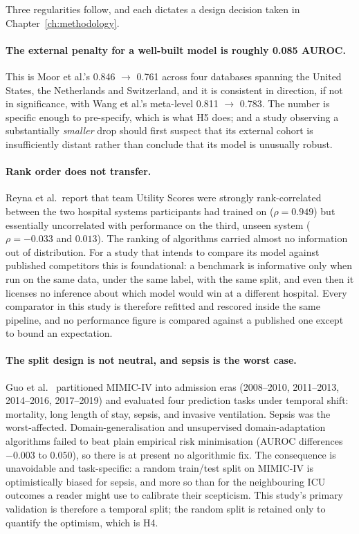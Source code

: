Three regularities follow, and each dictates a design decision taken in
Chapter~\ref{ch:methodology}.

\paragraph{The external penalty for a well-built model is roughly 0.085 AUROC.}
This is Moor et al.'s 0.846 $\rightarrow$ 0.761 across four databases spanning
the United States, the Netherlands and Switzerland, and it is consistent in
direction, if not in significance, with Wang et al.'s meta-level 0.811
$\rightarrow$ 0.783. The number is specific enough to pre-specify, which is
what H5 does; and a study observing a substantially \emph{smaller} drop should
first suspect that its external cohort is insufficiently distant rather than
conclude that its model is unusually robust.

\paragraph{Rank order does not transfer.} Reyna et al.\ report that team
Utility Scores were strongly rank-correlated between the two hospital systems
participants had trained on ($\rho = 0.949$) but essentially uncorrelated with
performance on the third, unseen system ($\rho = -0.033$ and $0.013$). The
ranking of algorithms carried almost no information out of distribution. For a
study that intends to compare its model against published competitors this is
foundational: a benchmark is informative only when run on the same data, under
the same label, with the same split, and even then it licenses no inference
about which model would win at a different hospital. Every comparator in this
study is therefore refitted and rescored inside the same pipeline, and no
performance figure is compared against a published one except to bound an
expectation.

\paragraph{The split design is not neutral, and sepsis is the worst case.}
Guo et al.\ \cite{guo2022temporal} partitioned MIMIC-IV into admission eras
(2008--2010, 2011--2013, 2014--2016, 2017--2019) and evaluated four prediction
tasks under temporal shift: mortality, long length of stay, sepsis, and
invasive ventilation. Sepsis was the worst-affected. Domain-generalisation and
unsupervised domain-adaptation algorithms failed to beat plain empirical risk
minimisation (AUROC differences $-0.003$ to $0.050$), so there is at present no
algorithmic fix. The consequence is unavoidable and task-specific: a random
train/test split on MIMIC-IV is optimistically biased for sepsis, and more so
than for the neighbouring ICU outcomes a reader might use to calibrate their
scepticism. This study's primary validation is therefore a temporal split; the
random split is retained only to quantify the optimism, which is H4.

